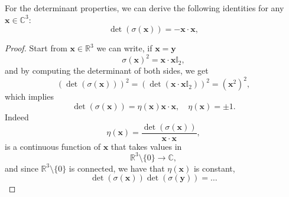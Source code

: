 For the determinant properties, we can derive the following identities for any \(\mathbf{x} \in \mathbb{C}^3\):
\[
    \det(\sigma(\mathbf{x})) = -\mathbf{x} \cdot \mathbf{x},
\]

\begin{proof}
    Start from \(\mathbf{x} \in \mathbb{R}^3\) we can write, if \(\mathbf{x} = \mathbf{y}\)
    \[
        \sigma(\mathbf{x})^2 = \mathbf{x} \cdot \mathbf{x} \mathbb{I}_2,
    \]
    and by computing the determinant of both sides, we get
    \[
        (\det(\sigma(\mathbf{x})))^2 = (\det(\mathbf{x} \cdot \mathbf{x} \mathbb{I}_2))^2 = (\mathbf{x}^2)^2,
    \]
    which implies
    \[
        \det(\sigma(\mathbf{x})) = \eta(\mathbf{x}) \mathbf{x} \cdot \mathbf{x}, \quad \eta(\mathbf{x}) = \pm 1.
    \]
    Indeed
    \[
        \eta(\mathbf{x}) = \frac{\det(\sigma(\mathbf{x}))}{\mathbf{x} \cdot \mathbf{x}},
    \]
    is a continuous function of \(\mathbf{x}\) that takes values in
    \[
        \mathbb{R}^3 \setminus \{0\} \to \mathbb{C},
    \]
    and since \(\mathbb{R}^3 \setminus \{0\}\) is connected, we have that \(\eta(\mathbf{x})\) is constant,
    \[
        \det(\sigma(\mathbf{x})) \det(\sigma(\mathbf{y})) = \dots
    \]
\end{proof}